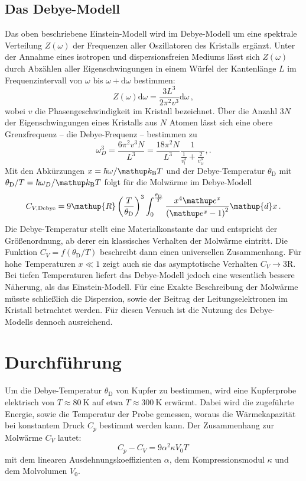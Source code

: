 \subsection{Das Debye-Modell}
\label{subsec:debye}
Das oben beschriebene Einstein-Modell wird im Debye-Modell um eine spektrale
Verteilung $Z(\omega)$ der Frequenzen aller Oszillatoren des Kristalls
ergänzt.
Unter der Annahme eines isotropen und dispersionsfreien Mediums lässt sich
$Z(\omega)$ durch Abzählen aller Eigenschwingungen in einem Würfel
der Kantenlänge $L$ im Frequenzintervall von $\omega$ bis
$\omega+\mathup{d}\omega$ bestimmen:
\begin{equation}
    \label{eqn:z}
    Z(\omega)\mathup{d}\omega = \frac{3L^3}{2\pi^2 v^3} \mathup{d}\omega\,,
\end{equation}
wobei $v$ die Phasengeschwindigkeit im Kristall bezeichnet.
Über die Anzahl $3N$ der Eigenschwingungen eines Kristalls aus $N$ Atomen
lässt sich eine obere Grenzfrequenz -- die Debye-Frequenz -- bestimmen zu
\begin{equation}
    \label{eqn:omega_debye}
    \omega_D^3 = \frac{6\pi^2 v^3 N}{L^3} = \frac{18 \pi^2 N}{L^3} \frac{1}{\frac{1}{v_\text{l}^3}+\frac{2}{v_\text{tr}^3}},.
\end{equation}
Mit den Abkürzungen $x = \hbar\omega/\kb T$ und der Debye-Temperatur
$\theta_\text{D}$ mit $\theta_\text{D}/T = \hbar\omega_D/\kb T$ folgt
für die Molwärme im Debye-Modell
\begin{equation}
    \label{eqn:cv_debye}
    C_{V,\text{Debye}} =
    9\mathup{R}\left(\frac{T}{\theta_\text{D}}\right)^3
    \int_0^{\frac{\theta_\text{D}}{T}}
    \frac{x^4\e^x}{\left(\e^x-1\right)^2}\mathup{d}x\,.
\end{equation}
Die Debye-Temperatur stellt eine Materialkonstante dar und entspricht der
Größenordnung, ab derer ein klassisches Verhalten der Molwärme eintritt.
Die Funktion $C_V = f(\theta_\text{D}/T)$ beschreibt dann einen universellen
Zusammenhang. Für hohe Temperaturen $x \ll \num{1}$ zeigt auch sie das
asymptotische Verhalten $C_V\to 3\mathup{R}$.
Bei tiefen Temperaturen liefert das Debye-Modell jedoch eine wesentlich
bessere Näherung, als das Einstein-Modell.
Für eine Exakte Beschreibung der Molwärme müsste schließlich die Dispersion,
sowie der Beitrag der Leitungselektronen im Kristall betrachtet werden.
Für diesen Versuch ist die Nutzung des Debye-Modells dennoch ausreichend.

\section{Durchführung}
\label{sec:durchführung}
Um die Debye-Temperatur $\theta_\text{D}$ von Kupfer zu bestimmen, wird
eine Kupferprobe elektrisch von $T \approx \SI{80}{\kelvin}$ auf etwa
$T \approx \SI{300}{\kelvin}$ erwärmt.
Dabei wird die zugeführte Energie, sowie die Temperatur der Probe gemessen,
woraus die Wärmekapazität bei konstantem Druck $C_p$ bestimmt werden kann.
Der Zusammenhang zur Molwärme $C_V$ lautet:
\begin{equation}
    \label{eqn:cp_cv}
    C_p - C_V = 9\alpha^2\kappa V_0 T\,
\end{equation}
mit dem linearen Ausdehnungskoeffizienten $\alpha$, dem Kompressionsmodul
$\kappa$ und dem Molvolumen $V_0$.

